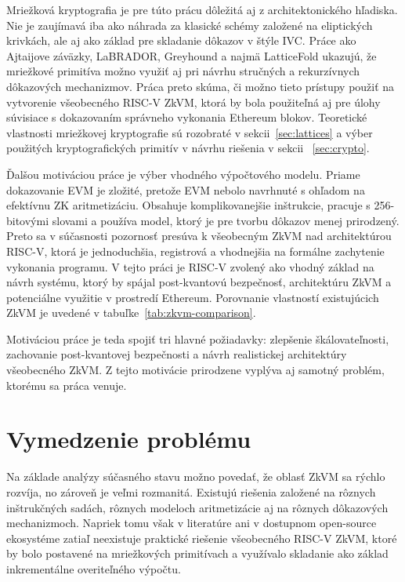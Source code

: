 Mriežková kryptografia je pre túto prácu dôležitá aj z architektonického
hľadiska. Nie je zaujímavá iba ako náhrada za klasické schémy založené na
eliptických krivkách, ale aj ako základ pre skladanie dôkazov v štýle IVC.
Práce ako Ajtaijove záväzky, LaBRADOR, Greyhound a najmä LatticeFold ukazujú,
že mriežkové primitíva možno využiť aj pri návrhu stručných a rekurzívnych
dôkazových mechanizmov. Práca preto skúma, či možno tieto prístupy použiť na
vytvorenie všeobecného RISC-V ZkVM, ktorá by bola použiteľná aj pre úlohy
súvisiace s dokazovaním správneho vykonania Ethereum blokov. Teoretické
vlastnosti mriežkovej kryptografie sú rozobraté v sekcii~\ref{sec:lattices} a
výber použitých kryptografických primitív v návrhu riešenia v sekcii
~\ref{sec:crypto}.

Ďalšou motiváciou práce je výber vhodného výpočtového modelu. Priame dokazovanie
EVM je zložité, pretože EVM nebolo navrhnuté s ohľadom na efektívnu ZK
aritmetizáciu. Obsahuje komplikovanejšie inštrukcie, pracuje s 256-bitovými
slovami a používa model, ktorý je pre tvorbu dôkazov menej prirodzený. Preto sa
v súčasnosti pozornosť presúva k všeobecným ZkVM nad architektúrou RISC-V,
ktorá je jednoduchšia, registrová a vhodnejšia na formálne zachytenie vykonania
programu. V tejto práci je RISC-V zvolený ako vhodný základ na návrh systému,
ktorý by spájal post-kvantovú bezpečnosť, architektúru ZkVM a potenciálne
využitie v prostredí Ethereum. Porovnanie vlastností existujúcich ZkVM je
uvedené v tabuľke~\ref{tab:zkvm-comparison}.

Motiváciou práce je teda spojiť tri hlavné požiadavky: zlepšenie
škálovateľnosti, zachovanie post-kvantovej bezpečnosti a návrh realistickej
architektúry všeobecného ZkVM. Z tejto motivácie prirodzene vyplýva aj samotný
problém, ktorému sa práca venuje.

\section{Vymedzenie problému}

Na základe analýzy súčasného stavu možno povedať, že oblasť ZkVM sa rýchlo
rozvíja, no zároveň je veľmi rozmanitá. Existujú riešenia založené na rôznych
inštrukčných sadách, rôznych modeloch aritmetizácie aj na rôznych dôkazových
mechanizmoch. Napriek tomu však v literatúre ani v dostupnom open-source
ekosystéme zatiaľ neexistuje praktické riešenie všeobecného RISC-V ZkVM, ktoré
by bolo postavené na mriežkových primitívach a využívalo skladanie ako základ
inkrementálne overiteľného výpočtu.

